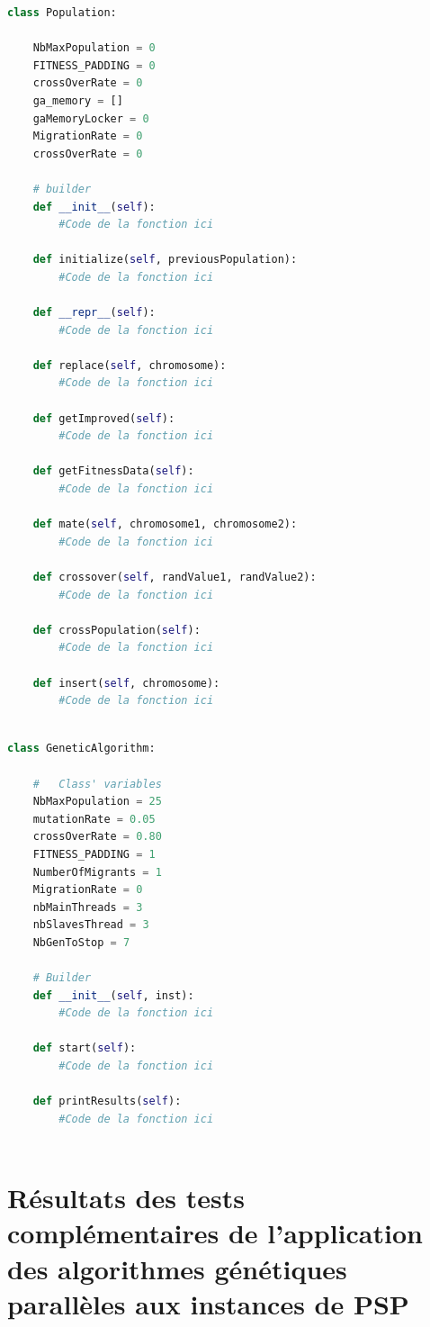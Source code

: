 \documentclass[12pt,a4paper]{article}
\begin{document}
    \begin{lstlisting}[language=python]
class Population:

	NbMaxPopulation = 0
	FITNESS_PADDING = 0
	crossOverRate = 0
	ga_memory = []
	gaMemoryLocker = 0
	MigrationRate = 0
	crossOverRate = 0
	
	# builder 
	def __init__(self):
		#Code de la fonction ici
	
	def initialize(self, previousPopulation):
		#Code de la fonction ici
	
	def __repr__(self):
		#Code de la fonction ici
	
	def replace(self, chromosome):
		#Code de la fonction ici
	
	def getImproved(self):
		#Code de la fonction ici
	
	def getFitnessData(self):
		#Code de la fonction ici
	
	def mate(self, chromosome1, chromosome2):
		#Code de la fonction ici
	
	def crossover(self, randValue1, randValue2):
		#Code de la fonction ici
	
	def crossPopulation(self):
		#Code de la fonction ici
	
	def insert(self, chromosome):
		#Code de la fonction ici
		
    \end{lstlisting}
    
    \begin{lstlisting}[language=python]
class GeneticAlgorithm:

	#	Class' variables
	NbMaxPopulation = 25
	mutationRate = 0.05
	crossOverRate = 0.80
	FITNESS_PADDING = 1
	NumberOfMigrants = 1
	MigrationRate = 0 
	nbMainThreads = 3
	nbSlavesThread = 3
	NbGenToStop = 7

	# Builder
	def __init__(self, inst):
		#Code de la fonction ici
	
	def start(self):
		#Code de la fonction ici
	
	def printResults(self):
		#Code de la fonction ici
		
    \end{lstlisting}
	
	\newpage
	\section{Résultats des tests complémentaires de l'application des algorithmes génétiques parallèles aux instances de PSP}
	
	\newpage
\end{document}
